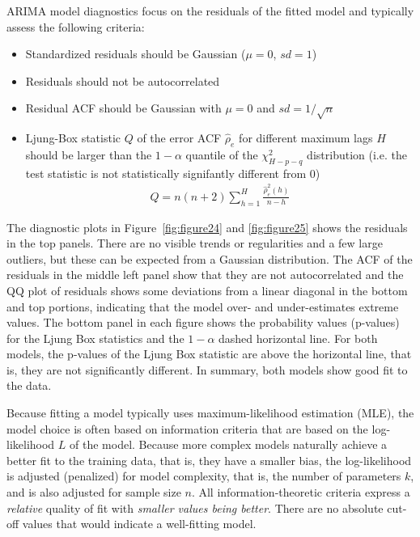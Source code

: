 ARIMA model diagnostics focus on the residuals of the fitted model and typically assess the following criteria:

\begin{itemize}
   \item Standardized residuals should be Gaussian ($\mu=0$, $sd=1$)
   \item Residuals should not be autocorrelated
   \item Residual ACF should be Gaussian with $\mu=0$ and $sd=1/\sqrt{n}$
   \item Ljung-Box statistic $Q$ of the error ACF $\hat\rho_e$ for different maximum lags $H$ should be larger than the $1-\alpha$ quantile of the $\chi^2_{H-p-q}$ distribution (i.e. the test statistic is not statistically signifantly different from $0$)
   \begin{align*}
   Q = n(n+2) \sum_{h=1}^H \frac{\hat\rho_e^2(h)}{n-h}
   \end{align*}
\end{itemize}

The diagnostic plots in Figure~\ref{fig:figure24} and \ref{fig:figure25} shows the residuals in the top panels. There are no visible trends or regularities and a few large outliers, but these can be expected from a Gaussian distribution. The ACF of the residuals in the middle left panel show that they are not autocorrelated and the QQ plot of residuals shows some deviations from a linear diagonal in the bottom and top portions, indicating that the model over- and under-estimates extreme values. The bottom panel in each figure shows the probability values (p-values) for the Ljung Box statistics and the $1-\alpha$ dashed horizontal line. For both models, the p-values of the Ljung Box statistic are above the horizontal line, that is, they are not significantly different. In summary, both models show good fit to the data.

Because fitting a model typically uses maximum-likelihood estimation (MLE), the model choice is often based on information criteria that are based on the log-likelihood $L$ of the model. Because more complex models naturally achieve a better fit to the training data, that is, they have a smaller bias, the log-likelihood is adjusted (penalized) for model complexity, that is, the number of parameters $k$, and is also adjusted for sample size $n$. All information-theoretic criteria express a \emph{relative} quality of fit with \emph{smaller values being better}. There are no absolute cut-off values that would indicate a well-fitting model.

